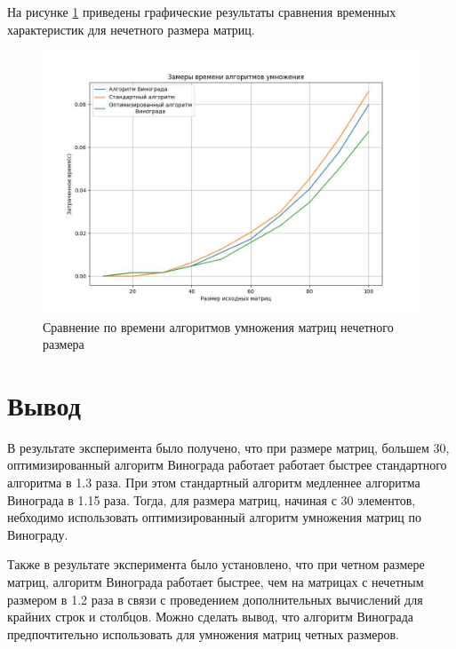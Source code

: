 На рисунке \ref{img:odd} приведены графические результаты сравнения временных характеристик для нечетного размера матриц.

\begin{figure}[H]
	\begin{center}
		\includegraphics[scale=0.5]{img/odd.jpeg}
	\end{center}
	\captionsetup{justification=centering}
	\caption{Сравнение по времени алгоритмов умножения матриц нечетного размера}
	\label{img:odd}
\end{figure}

\section{Вывод}

В результате эксперимента было получено, что при размере матриц, большем 30, оптимизированный алгоритм Винограда работает работает быстрее стандартного алгоритма в 1.3 раза. При этом стандартный алгоритм медленнее алгоритма Винограда в 1.15 раза. Тогда, для размера матриц, начиная с 30 элементов, небходимо использовать оптимизированный алгоритм умножения матриц по Винограду.

Также в результате эксперимента было установлено, что при четном размере матриц, алгоритм Винограда работает быстрее, чем на матрицах с нечетным размером в 1.2 раза в связи с проведением дополнительных вычислений для крайних строк и столбцов. Можно сделать вывод, что алгоритм Винограда предпочтительно использовать для умножения матриц четных размеров.
